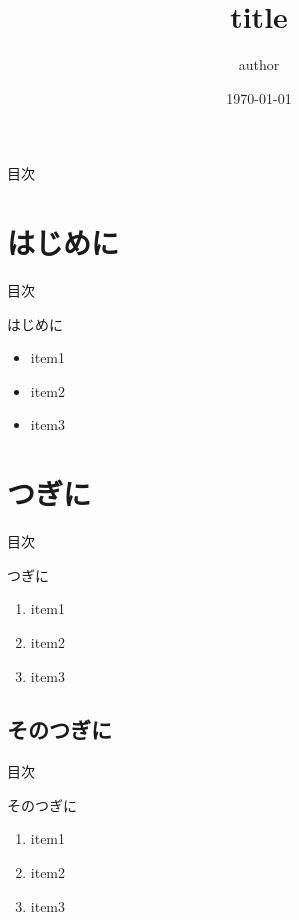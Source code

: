 \documentclass[aspectratio=169, dvipdfmx, 11pt, xcolor={usenames, dvipsnames}]{beamer} %
\title{title}
\date{\today}
\author{author}
\begin{document}
\maketitle

\begin{frame}{目次}
	\tableofcontents
\end{frame}

\section{はじめに}
\begin{frame}{目次}
	\tableofcontents[currentsection]
\end{frame}

\begin{frame}{はじめに}
	\begin{itemize}
		\item item1
		\item item2
		\item item3
	\end{itemize}
\end{frame}

\section{つぎに}
\begin{frame}{目次}
	\tableofcontents[currentsection]
\end{frame}

\begin{frame}{つぎに}
	\begin{enumerate}
		\item item1
		\item item2
		\item item3
	\end{enumerate}
\end{frame}

\subsection{そのつぎに}
\begin{frame}{目次}
\end{frame}

\begin{frame}{そのつぎに}
	\begin{enumerate}
		\item item1
		\item item2
		\item item3
	\end{enumerate}
\end{frame}
\end{document}

